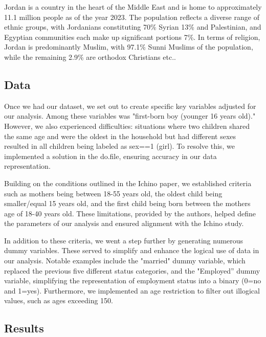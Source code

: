 \documentclass[12pt,draft,a4paper]{article}
\begin{document}
Jordan is a country in the heart of the Middle East and is home to approximately 11.1 million people as of the year 2023. 
The population reflects a diverse range of ethnic groups, with Jordanians constituting 70\% Syrian 13\% and Palestinian, and Egyptian communities each make up significant portions 7\%. 
In terms of religion, Jordan is predominantly Muslim, with 97.1\% Sunni Muslims of the population, while the remaining 2.9\% are orthodox Christians etc..


\subsection{Data}

Once we had our dataset, we set out to create specific key variables adjusted for our analysis. 
Among these variables was "first-born boy (younger 16 years old)." 
However, we also experienced difficulties: 
situations where two children shared the same age and were the oldest in the household but had different sexes resulted in all children being labeled as sex==1 (girl). 
To resolve this, we implemented a solution in the do.file, ensuring accuracy in our data representation.

Building on the conditions outlined in the Ichino paper, we established criteria such as mothers being between 18-55 years old, 
the oldest child being smaller/equal 15 years old, and the first child being born between the mothers age of 18-40 years old. 
These limitations, provided by the authors, helped define the parameters of our analysis and ensured alignment with the Ichino study.

In addition to these criteria, we went a step further by generating numerous dummy variables. 
These served to simplify and enhance the logical use of data in our analysis. 
Notable examples include the "married" dummy variable, which replaced the previous five different status categories, 
and the "Employed” dummy variable, simplifying the representation of employment status into a binary (0=no and 1=yes). 
Furthermore, we implemented an age restriction to filter out illogical values, such as ages exceeding 150.


\subsection{Results}
\end{document}
